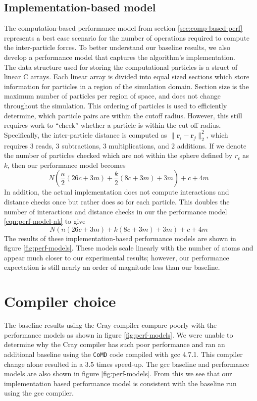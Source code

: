\documentclass[12pt]{article}
\begin{document}
\subsection{Implementation-based model}
The computation-based performance model from section
\ref{sec:comp-based-perf} represents a best case scenario for the
number of operations required to compute the inter-particle forces.
To better understand our baseline results, we also develop a
performance model that captures the algorithm's implementation.
\\

The data structure used for storing the computational particles is a
struct of linear C arrays. Each linear array is divided into equal
sized sections which store information for particles in a region of
the simulation domain.  Section size is the maximum number of
particles per region of space, and does not change throughout the
simulation.  This ordering of particles is used to efficiently
determine, which particle pairs are within the cutoff radius.
However, this still requires work to ``check'' whether a particle is
within the cut-off radius. Specifically, the inter-particle distance
is computed as $\| \bm{r}_i - \bm{r}_j\|_2^2$, which requires 3 reads,
3 subtractions, 3 multiplications, and 2 additions.  If we denote the
number of particles checked which are not within the sphere defined by
$r_c$ as $k$, then our performance model becomes
\begin{equation}
  N \left(\frac{n}{2} \left(26 c + 3 m\right)+\frac{k}{2} \left(8 c + 3 m\right) + 3 m\right) + c + 4 m
  \label{eqn:perf-model-nk}
\end{equation}
In addition, the actual implementation does not compute interactions
and distance checks once but rather does so for each particle. This
doubles the number of interactions and distance checks in our the
performance model \ref{eqn:perf-model-nk} to give
\begin{equation}
  N \left(n \left(26 c + 3 m\right)+k \left(8 c + 3 m\right) + 3 m\right) + c + 4 m
  \label{eqn:perf-model-2n2k}
\end{equation}
The results of these implementation-based performance models are shown
in figure \ref{fig:perf-models}. These models scale linearly with the
number of atoms and appear much closer to our experimental results;
however, our performance expectation is still nearly an order of
magnitude less than our baseline.

\section{Compiler choice}
The baseline results using the Cray compiler compare poorly with the
performance models as shown in figure \ref{fig:perf-models}. We were
unable to determine why the Cray compiler has such poor performance
and ran an additional baseline using the \texttt{CoMD} code compiled
with gcc 4.7.1. This compiler change alone resulted in a 3.5 times
speed-up. The gcc baseline and performance models are also shown in
figure \ref{fig:perf-models}. From this we see that our implementation
based performance model is consistent with the baseline run using the
gcc compiler.
\end{document}
